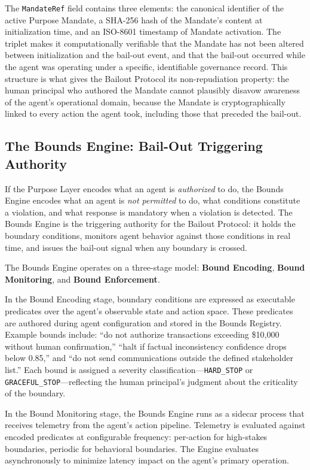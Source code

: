 The \texttt{MandateRef} field contains three elements: the canonical identifier of the active Purpose Mandate, a SHA-256 hash of the Mandate's content at initialization time, and an ISO-8601 timestamp of Mandate activation. The triplet makes it computationally verifiable that the Mandate has not been altered between initialization and the bail-out event, and that the bail-out occurred while the agent was operating under a specific, identifiable governance record. This structure is what gives the Bailout Protocol its non-repudiation property: the human principal who authored the Mandate cannot plausibly disavow awareness of the agent's operational domain, because the Mandate is cryptographically linked to every action the agent took, including those that preceded the bail-out.

\subsection{The Bounds Engine: Bail-Out Triggering Authority}
\label{subsection:bailout-bounds-engine}

If the Purpose Layer encodes what an agent is \emph{authorized} to do, the Bounds Engine encodes what an agent is \emph{not permitted} to do, what conditions constitute a violation, and what response is mandatory when a violation is detected. The Bounds Engine is the triggering authority for the Bailout Protocol: it holds the boundary conditions, monitors agent behavior against those conditions in real time, and issues the bail-out signal when any boundary is crossed.

The Bounds Engine operates on a three-stage model: \textbf{Bound Encoding}, \textbf{Bound Monitoring}, and \textbf{Bound Enforcement}.

In the Bound Encoding stage, boundary conditions are expressed as executable predicates over the agent's observable state and action space. These predicates are authored during agent configuration and stored in the Bounds Registry. Example bounds include: ``do not authorize transactions exceeding \$10,000 without human confirmation,'' ``halt if factual inconsistency confidence drops below 0.85,'' and ``do not send communications outside the defined stakeholder list.'' Each bound is assigned a severity classification—\texttt{HARD\_STOP} or \texttt{GRACEFUL\_STOP}—reflecting the human principal's judgment about the criticality of the boundary.

In the Bound Monitoring stage, the Bounds Engine runs as a sidecar process that receives telemetry from the agent's action pipeline. Telemetry is evaluated against encoded predicates at configurable frequency: per-action for high-stakes boundaries, periodic for behavioral boundaries. The Engine evaluates asynchronously to minimize latency impact on the agent's primary operation.

